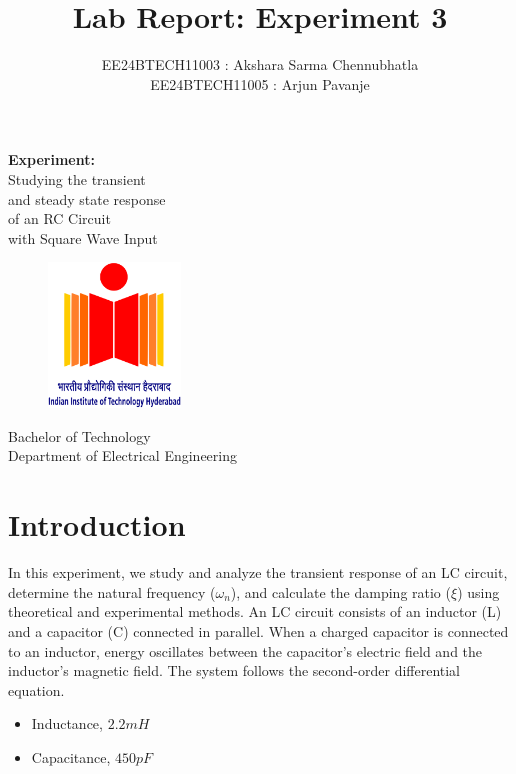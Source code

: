 \documentclass[a4paper,12pt]{article}
\title{\textbf{Lab Report: Experiment 3}}
\author{EE24BTECH11003 : Akshara Sarma Chennubhatla\\EE24BTECH11005 : Arjun Pavanje}
\begin{document}
\maketitle
\begin{center}
	\textbf{Experiment:}\\Studying the transient\\and steady state response\\of an RC Circuit\\with Square Wave Input
\end{center}
\vspace{30pt}
\begin{figure}[h!]
	\centering
	\includegraphics[width = 100pt]{.logo/logo.png}\\
\end{figure}
\begin{center}
	Bachelor of Technology\\
	\vspace{10pt}
	Department of Electrical Engineering\\
\end{center}
\newpage

\section{Introduction}
In this experiment, we study and analyze the transient response of an LC circuit, determine the natural frequency ($\omega_n$), and calculate the damping ratio ($\xi$) using theoretical and experimental methods. \newline An LC circuit consists of an inductor (L) and a capacitor (C) connected in parallel. When a charged capacitor is connected to an inductor, energy oscillates between the capacitor's electric field and the inductor's magnetic field. The system follows the second-order differential equation.

\begin{itemize}
    \item Inductance, $2.2 mH$ 
    \item Capacitance, $ 450 pF $
\end{itemize}
\end{document}
